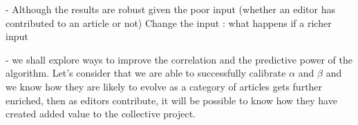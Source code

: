 - Although the results are robust given the poor input (whether an editor has contributed to an article or not) Change the input : what happens if a richer input 


- we shall explore ways to improve the correlation and the predictive power of the algorithm. Let's consider that we are able to successfully calibrate $\alpha$ and $\beta$ and we know how they are likely to evolve as a category of articles gets further enriched, then as editors contribute, it will be possible to know how they have created added value to the collective project.





